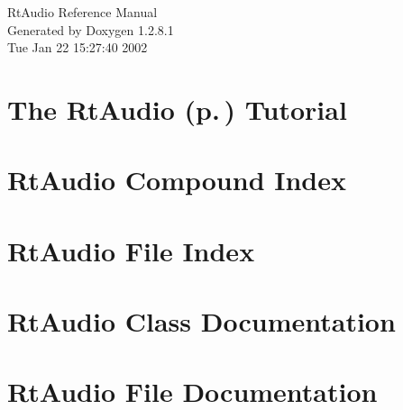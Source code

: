 \documentclass[a4paper]{book}
\begin{document}
\begin{titlepage}
\vspace*{7cm}
\begin{center}
{\Large Rt\-Audio Reference Manual}\\
\vspace*{1cm}
{\large Generated by Doxygen 1.2.8.1}\\
\vspace*{0.5cm}
{\small Tue Jan 22 15:27:40 2002}\\
\end{center}
\end{titlepage}
\clearemptydoublepage
{}
\tableofcontents
\clearemptydoublepage
{}
\chapter{The {\bf Rt\-Audio} {\rm (p.\,\pageref{classRtAudio})} Tutorial}
\label{index}
\chapter{Rt\-Audio Compound Index}

\chapter{Rt\-Audio File Index}

\chapter{Rt\-Audio Class Documentation}



\chapter{Rt\-Audio File Documentation}


\printindex
\end{document}
